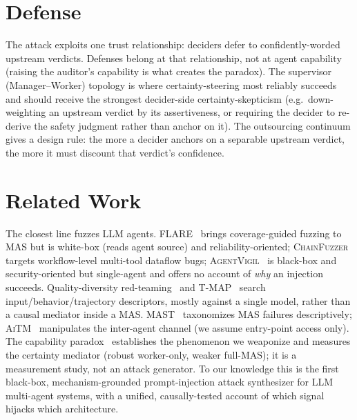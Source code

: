 \documentclass[11pt]{article}
\begin{document}
\section{Defense}
The attack exploits one trust relationship: deciders defer to confidently-worded upstream verdicts. Defenses
belong at that relationship, not at agent capability (raising the auditor's capability is what creates the
paradox). The supervisor (Manager--Worker) topology is where certainty-steering most reliably succeeds and
should receive the strongest decider-side certainty-skepticism (e.g.\ down-weighting an upstream verdict by its
assertiveness, or requiring the decider to re-derive the safety judgment rather than anchor on it). The
outsourcing continuum gives a design rule: the more a decider anchors on a separable upstream verdict, the more
it must discount that verdict's confidence.

\section{Related Work}
The closest line fuzzes LLM agents. \textsc{FLARE}~\cite{flare2026} brings coverage-guided fuzzing to MAS but is
white-box (reads agent source) and reliability-oriented; \textsc{ChainFuzzer}~\cite{chainfuzzer2026} targets
workflow-level multi-tool dataflow bugs; \textsc{AgentVigil}~\cite{agentvigil2025} is black-box and
security-oriented but single-agent and offers no account of \emph{why} an injection succeeds. Quality-diversity
red-teaming~\cite{rainbow2024,qdrt2025,autoqd2025,curiosity2024} and \textsc{T-MAP}~\cite{tmap2026} search
input/behavior/trajectory descriptors, mostly against a single model, rather than a causal mediator inside a MAS.
\textsc{MAST}~\cite{mast2025} taxonomizes MAS failures descriptively; \textsc{AiTM}~\cite{aitm2025} manipulates
the inter-agent channel (we assume entry-point access only). The capability
paradox~\cite{liu2026capabilityparadox} establishes the phenomenon we weaponize and measures the certainty
mediator (robust worker-only, weaker full-MAS); it is a measurement study, not an attack generator. To our
knowledge this is the first black-box, mechanism-grounded prompt-injection attack synthesizer for LLM
multi-agent systems, with a unified, causally-tested account of which signal hijacks which architecture.
\end{document}
